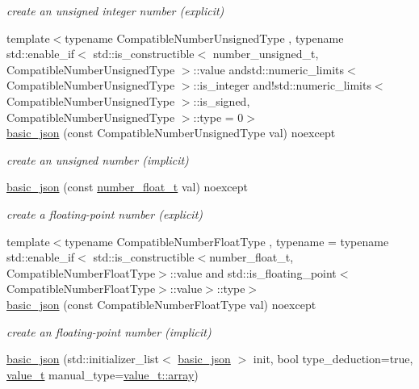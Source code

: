 \begin{DoxyCompactItemize}
\begin{DoxyCompactList}\small\item\em create an unsigned integer number (explicit) \end{DoxyCompactList}\item 
{\footnotesize template$<$typename Compatible\-Number\-Unsigned\-Type , typename std\-::enable\-\_\-if$<$ std\-::is\-\_\-constructible$<$ number\-\_\-unsigned\-\_\-t, Compatible\-Number\-Unsigned\-Type $>$\-::value andstd\-::numeric\-\_\-limits$<$ Compatible\-Number\-Unsigned\-Type $>$\-::is\-\_\-integer and!std\-::numeric\-\_\-limits$<$ Compatible\-Number\-Unsigned\-Type $>$\-::is\-\_\-signed, Compatible\-Number\-Unsigned\-Type $>$\-::type  = 0$>$ }\\\hyperlink{classnlohmann_1_1basic__json_a68a5f34b164a07b8ced13fcf2b7ec834}{basic\-\_\-json} (const Compatible\-Number\-Unsigned\-Type val) noexcept
\begin{DoxyCompactList}\small\item\em create an unsigned number (implicit) \end{DoxyCompactList}\item 
\hyperlink{classnlohmann_1_1basic__json_a2badcf191deabf579abcf8d3654da26f}{basic\-\_\-json} (const \hyperlink{classnlohmann_1_1basic__json_a74a0013e847fdc574b48f931f0e757e1}{number\-\_\-float\-\_\-t} val) noexcept
\begin{DoxyCompactList}\small\item\em create a floating-\/point number (explicit) \end{DoxyCompactList}\item 
{\footnotesize template$<$typename Compatible\-Number\-Float\-Type , typename  = typename std\-::enable\-\_\-if$<$                 std\-::is\-\_\-constructible$<$number\-\_\-float\-\_\-t, Compatible\-Number\-Float\-Type$>$\-::value and                 std\-::is\-\_\-floating\-\_\-point$<$\-Compatible\-Number\-Float\-Type$>$\-::value$>$\-::type$>$ }\\\hyperlink{classnlohmann_1_1basic__json_a4bbdfd6dd8d2e6fc9ac5d81ef61ba3fe}{basic\-\_\-json} (const Compatible\-Number\-Float\-Type val) noexcept
\begin{DoxyCompactList}\small\item\em create an floating-\/point number (implicit) \end{DoxyCompactList}\item 
\hyperlink{classnlohmann_1_1basic__json_afeb998aec45296bc2050bd1c41ef41eb}{basic\-\_\-json} (std\-::initializer\-\_\-list$<$ \hyperlink{classnlohmann_1_1basic__json}{basic\-\_\-json} $>$ init, bool type\-\_\-deduction=true, \hyperlink{classnlohmann_1_1basic__json_a231b02148577b69a154b2ce2c87a5522}{value\-\_\-t} manual\-\_\-type=\hyperlink{classnlohmann_1_1basic__json_a231b02148577b69a154b2ce2c87a5522af1f713c9e000f5d3f280adbd124df4f5}{value\-\_\-t\-::array})

\end{DoxyCompactItemize}
